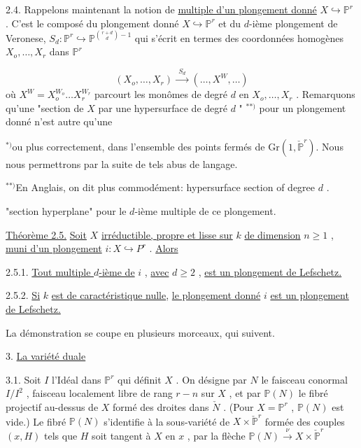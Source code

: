 2.4.    Rappelons maintenant la notion de  \underline{multiple d'un plongement donné}  $X \hookrightarrow \mathbb{P}^r$  . C'est le composé du plongement donné  $X \hookrightarrow \mathbb{P}^r$ et du $d$-ième plongement de Veronese,  $S_d : \mathbb{P}^r \hookrightarrow \mathbb{P}^{\binom{r+d}{d}-1}$  qui s'écrit en termes des coordonnées homogènes  $X_o,\ldots,X_r$  dans  $\mathbb{P}^r$

\begin{equation*}
(X_o,\ldots,X_r) \xrightarrow{\ \ S_d\ \ } (\ldots,X^W,\ldots)
\end{equation*}
où  $X^W = X_o^{W_o} \ldots X_r^{W_r}$  parcourt les monômes de degré  $d$  en $X_o,\ldots,X_r$  . Remarquons qu'une "section de  $X$  par une hypersurface de degré  $d$ " $^{**)}$ pour un plongement donné n'est autre qu'une 

$^{*)}$ou plus correctement, dans l'ensemble des points fermés de $\mathrm{Gr}(1,\check{\mathbb{P}}^r)$. Nous nous permettrons par la suite de tels abus de langage.

$^{**)}$En Anglais, on  dit plus commodément: hypersurface section of degree $d$ .



 "section hyperplane" pour  le $d$-ième multiple de ce plongement.

\underline{Théorème 2.5.}    \underline{Soit}  $X$  \underline{irréductible, propre et lisse sur}  $k$  \underline{de dimension} $n \geq 1$  ,  \underline{muni d'un plongement}  $i : X \hookrightarrow P^r$  . \underline{Alors}

2.5.1. \underline{Tout multiple $d$-ième de}  $i$  ,  \underline{avec}  $d \geq 2$  ,  \underline{est un plongement de Lefschetz.}

2.5.2. \underline{Si}  $k$  \underline{est de caractéristique nulle}, \underline{le plongement donné}  $i$ \underline{est un plongement de Lefschetz.}

La démonstration se coupe en plusieurs morceaux, qui suivent.


3. \underline{La variété duale}

3.1.    Soit  $I$  l'Idéal dans  $\mathbb{P}^r$  qui définit  $X$  . On désigne par $N$  le faisceau conormal  $I/I^2$  , faisceau localement libre de rang $r-n$  sur  $X$  , et par  $\mathbb{P}(N)$  le fibré projectif au-dessus de  $X$ formé des droites dans  $\check{N}$  . (Pour  $X = \mathbb{P}^r$  ,  $\mathbb{P}(N)$  est vide.) Le fibré  $\mathbb{P}(N)$  s'identifie à la sous-variété de  $X \times \check{\mathbb{P}}^r$  formée des couples  $(x, H)$  tels que  $H$  soit tangent à  $X$  en  $x$  , par la flèche  $\mathbb{P}(N) \xrightarrow{\ \nu\ } X \times \check{\mathbb{P}}^r$

